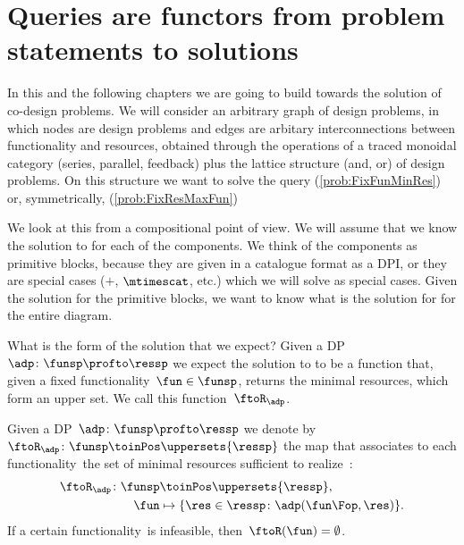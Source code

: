 \section{Queries are functors from problem statements to solutions}

\publictodomessage

In this and the following chapters we are going to build towards the solution of co-design problems.
We will consider an arbitrary graph of design problems, in which nodes are design problems and edges are arbitary interconnections between functionality and resources, obtained through the operations of a traced monoidal category (series, parallel, feedback) plus the lattice structure (and, or) of design problems.
On this structure we want to solve the query \FixFunMinRes (\cref{prob:FixFunMinRes}) or, symmetrically, \FixResMaxFun (\cref{prob:FixResMaxFun})

We look at this from a compositional point of view.
We will assume that we know the solution to \FixFunMinRes for each of the components.
We think of the components as primitive blocks, because they are given in a catalogue format as a DPI, or they are special cases ($+$, $\mtimescat$, etc.) which we will solve as special cases.
Given the solution for the primitive blocks, we want to know what is the solution for \FixFunMinRes for the entire diagram.

What is the form of the solution that we expect?
Given a DP~$\adp\colon \funsp \profto \ressp$ we expect the solution to \FixFunMinRes to be a function that, given a fixed functionality~$\fun\in\funsp$, returns the minimal resources, which form an upper set.
We call this function~$\ftoR_\adp$.

\begin{definition}
	\label{def:ftoR-dp}
	Given a DP~$\adp\colon\funsp\profto\ressp$ we denote by~$\ftoR_{\adp}\colon \funsp\toinPos \uppersets{\ressp}$ the map that associates to each functionality~\fun the set of minimal resources sufficient to realize~\fun:
	\begin{equation*}
		\begin{aligned}
			\ftoR_{\adp}\colon \funsp & \toinPos \uppersets{\ressp},                              \\
			\fun                      & \mapsto \{ \res \in \ressp \colon \adp(\fun\Fop, \res)\}.
		\end{aligned}
	\end{equation*}
	If a certain functionality~\fun is infeasible, then~$\ftoR(\fun)=\emptyset$.
\end{definition}

